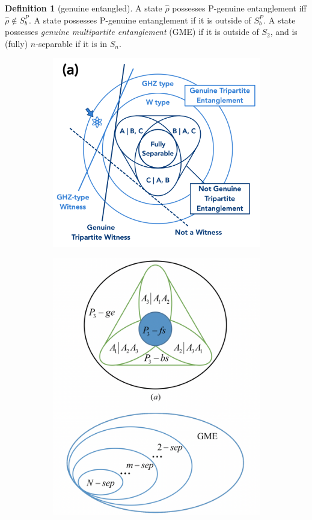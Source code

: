 \documentclass[
aps,
pra,
linenumbers,
floatfix,
]{revtex4-2}
\theoremstyle{plain}
\theoremstyle{definition}
\newtheorem{definition}{Definition}
\newcommand{\dm}{\hat{\rho}}
\begin{document}
\begin{definition}[genuine entangled]\label{def:genuinely_entangled}
	A state $\dm$ possesses P-genuine entanglement iff $\dm\notin S_b^P$.
	A state possesses P-genuine entanglement if it is outside of $S_b^P$.
	A state possesses \emph{genuine multipartite entanglement} (GME) if it is outside of $S_2$, and is (fully) $n$-separable if it is in $S_n$.
\end{definition}
\begin{figure}[!ht]
	\centering
	\begin{subfigure}{0.3\textwidth}
		\centering
		\includegraphics[width=.9\linewidth]{gme.png}
	\end{subfigure}
	\begin{subfigure}{0.3\textwidth}
		\centering
		\includegraphics[width=.8\linewidth]{sep.png}

\end{subfigure}
\end{figure}
\end{document}
